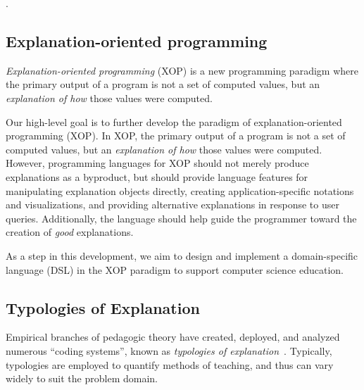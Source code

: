 \documentclass[conference]{IEEEtran}
\begin{document}
%
\cite{HDS02}.



\subsection{Explanation-oriented programming}

\emph{Explanation-oriented programming} (XOP) is a new programming paradigm
where the primary output of a program is not a set of computed values, but an
\emph{explanation of how} those values were computed. 


Our high-level goal is to further develop the paradigm of explanation-oriented
programming (XOP). In XOP, the primary output of a program is not a set of
computed values, but an \emph{explanation of how} those values were computed.
However, programming languages for XOP should not merely produce explanations
as a byproduct, but should provide language features for manipulating
explanation objects directly, creating application-specific notations and
visualizations, and providing alternative explanations in response to user
queries. Additionally, the language should help guide the programmer toward the
creation of \emph{good} explanations.

As a step in this development, we aim to design and implement a domain-specific
language (DSL) in the XOP paradigm to support computer science education. 


\subsection{Typologies of Explanation}

Empirical branches of pedagogic theory have created, deployed, and analyzed
numerous ``coding systems'', known as \emph{typologies of
  explanation}~\cite{westbury1971research, nla.cat-vn407830,
  rosenshine1968objectively, hyman1968teaching, Ennis1969-ENNLIT,
  smith1967language, bellack1966language}. Typically, typologies are employed to
quantify methods of teaching, and thus can vary widely to suit the problem 
domain.
\end{document}
